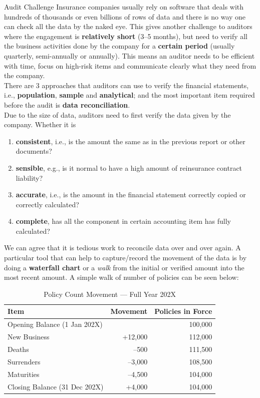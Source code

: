 \documentclass[aspectratio=169]{beamer}
\begin{document}
\begin{frame}[allowframebreaks]{Audit Challenge}
Insurance companies usually rely on software that deals with hundreds of thousands or even billions of rows of data and there is no way one can check all the data by the naked eye. This gives another challenge to auditors where the engagement is \textbf{relatively short} (3--5 months), but need to verify all the business activities done by the company for a \textbf{certain period} (usually quarterly, semi-annually or annually). This means an auditor needs to be efficient with time, focus on high-risk items and communicate clearly what they need from the company.\\
There are 3 approaches that auditors can use to verify the financial statements, i.e., \textbf{population}, \textbf{sample} and \textbf{analytical}; and the most important item required before the audit is \textbf{data reconciliation}. \\
\framebreak
Due to the size of data, auditors need to first verify the data given by the company. Whether it is 
\begin{enumerate}
\item \textbf{consistent}, i.e., is the amount the same as in the previous report or other documents?
\item \textbf{sensible}, e.g., is it normal to have a high amount of reinsurance contract liability?
\item \textbf{accurate}, i.e., is the amount in the financial statement correctly copied or correctly calculated?
\item \textbf{complete}, has all the component in certain accounting item has fully calculated?
\end{enumerate}
We can agree that it is tedious work to reconcile data over and over again. A particular tool that can help to capture/record the movement of the data is by doing a \textbf{waterfall  chart} or a \textit{walk} from the initial or verified amount into the most recent amount. 
A simple walk of number of policies can be seen below:
\begin{table}[ht]
\centering
\caption{Policy Count Movement --- Full Year 202X}
\vspace{4pt}
\begin{tabular}{lrr}
\toprule
\textbf{Item} & \textbf{Movement} & \textbf{Policies in Force} \\
\midrule
Opening Balance (1 Jan 202X)  &          & 100,000 \\
\addlinespace
New Business                  & +12,000  & 112,000 \\
\addlinespace
Deaths                        &    --500 & 111,500 \\
Surrenders                    &  --3,000 & 108,500 \\
Maturities                    &  --4,500 & 104,000 \\
\midrule
Closing Balance (31 Dec 202X) &  +4,000  & 104,000 \\
\bottomrule
\end{tabular}
\end{table}
\end{frame}
\end{document}
